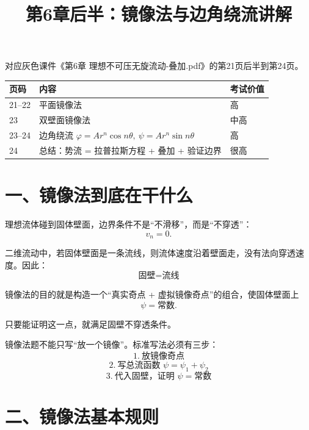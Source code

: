 \documentclass[11pt,a4paper]{ctexart}
\title{\vspace{-1.2em}第6章后半：镜像法与边角绕流讲解}
\author{}
\date{}
\begin{document}
\maketitle
\vspace{-2.2em}

\begin{tcolorbox}[colback=blue!3,colframe=blue!50!black,title=对应课件范围]
对应灰色课件《第6章 理想不可压无旋流动-叠加.pdf》的第21页后半到第24页。
\end{tcolorbox}

\begin{center}
\begin{tabular}{lll}
\toprule
页码 & 内容 & 考试价值\\
\midrule
21--22 & 平面镜像法 & 高\\
23 & 双壁面镜像法 & 中高\\
23--24 & 边角绕流 $\varphi=Ar^n\cos n\theta,\ \psi=Ar^n\sin n\theta$ & 高\\
24 & 总结：势流 = 拉普拉斯方程 + 叠加 + 验证边界 & 很高\\
\bottomrule
\end{tabular}
\end{center}

\section*{一、镜像法到底在干什么}

理想流体碰到固体壁面，边界条件不是“不滑移”，而是“不穿透”：
\[
v_n=0.
\]

二维流动中，若固体壁面是一条流线，则流体速度沿着壁面走，没有法向穿透速度。因此：
\[
\boxed{\text{固壁}=\text{流线}}
\]

镜像法的目的就是构造一个“真实奇点 + 虚拟镜像奇点”的组合，使固体壁面上
\[
\psi=\text{常数}.
\]

只要能证明这一点，就满足固壁不穿透条件。

\begin{tcolorbox}[colback=yellow!6,colframe=orange!75!black,title=考试判分点]
镜像法题不能只写“放一个镜像”。标准写法必须有三步：
\[
1.\ \text{放镜像奇点}
\]
\[
2.\ \text{写总流函数 } \psi=\psi_1+\psi_2
\]
\[
3.\ \text{代入固壁，证明 } \psi=\text{常数}
\]
\end{tcolorbox}

\section*{二、镜像法基本规则}
\end{document}
